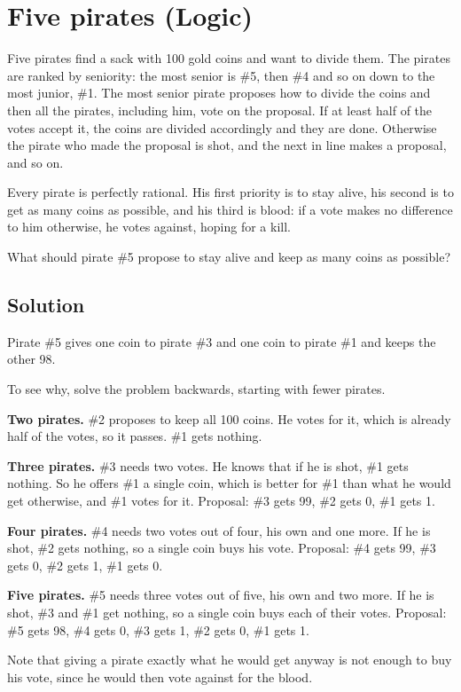 \section {Five pirates (Logic)}

Five pirates find a sack with 100 gold coins and want to divide them.
The pirates are ranked by seniority: the most senior is \#5, then \#4 and so on down to the most junior, \#1.
The most senior pirate proposes how to divide the coins and then all the pirates, including him, vote on the proposal.
If at least half of the votes accept it, the coins are divided accordingly and they are done.
Otherwise the pirate who made the proposal is shot, and the next in line makes a proposal, and so on.

Every pirate is perfectly rational. His first priority is to stay alive, his second is to get as many coins as possible,
and his third is blood: if a vote makes no difference to him otherwise, he votes against, hoping for a kill.

What should pirate \#5 propose to stay alive and keep as many coins as possible?

\subsection{Solution}

Pirate \#5 gives one coin to pirate \#3 and one coin to pirate \#1 and keeps the other 98.

To see why, solve the problem backwards, starting with fewer pirates.

\textbf{Two pirates.} \#2 proposes to keep all 100 coins. He votes for it, which is already half of the votes, so it passes.
\#1 gets nothing.

\textbf{Three pirates.} \#3 needs two votes. He knows that if he is shot, \#1 gets nothing.
So he offers \#1 a single coin, which is better for \#1 than what he would get otherwise, and \#1 votes for it.
Proposal: \#3 gets 99, \#2 gets 0, \#1 gets 1.

\textbf{Four pirates.} \#4 needs two votes out of four, his own and one more.
If he is shot, \#2 gets nothing, so a single coin buys his vote.
Proposal: \#4 gets 99, \#3 gets 0, \#2 gets 1, \#1 gets 0.

\textbf{Five pirates.} \#5 needs three votes out of five, his own and two more.
If he is shot, \#3 and \#1 get nothing, so a single coin buys each of their votes.
Proposal: \#5 gets 98, \#4 gets 0, \#3 gets 1, \#2 gets 0, \#1 gets 1.

Note that giving a pirate exactly what he would get anyway is not enough to buy his vote, since he would then vote against for the blood.
